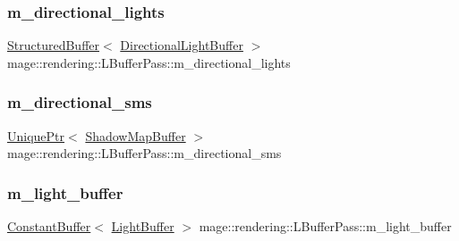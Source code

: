 \subsubsection{\texorpdfstring{m\+\_\+directional\+\_\+lights}{m\_directional\_lights}}
{\footnotesize\ttfamily \mbox{\hyperlink{classmage_1_1rendering_1_1_structured_buffer}{Structured\+Buffer}}$<$ \mbox{\hyperlink{structmage_1_1rendering_1_1_directional_light_buffer}{Directional\+Light\+Buffer}} $>$ mage\+::rendering\+::\+L\+Buffer\+Pass\+::m\+\_\+directional\+\_\+lights\hspace{0.3cm}{\ttfamily [private]}}

\mbox{\label{classmage_1_1rendering_1_1_l_buffer_pass_a76627c9dc2cc229c07584dc2b2599db4}} 
\subsubsection{\texorpdfstring{m\+\_\+directional\+\_\+sms}{m\_directional\_sms}}
{\footnotesize\ttfamily \mbox{\hyperlink{namespacemage_a3316d7143a973e37adf1110f2e80ca31}{Unique\+Ptr}}$<$ \mbox{\hyperlink{classmage_1_1rendering_1_1_shadow_map_buffer}{Shadow\+Map\+Buffer}} $>$ mage\+::rendering\+::\+L\+Buffer\+Pass\+::m\+\_\+directional\+\_\+sms\hspace{0.3cm}{\ttfamily [private]}}

\mbox{\label{classmage_1_1rendering_1_1_l_buffer_pass_ab80d18b8193e90588afa5e992b5b1af8}} 
\subsubsection{\texorpdfstring{m\+\_\+light\+\_\+buffer}{m\_light\_buffer}}
{\footnotesize\ttfamily \mbox{\hyperlink{classmage_1_1rendering_1_1_constant_buffer}{Constant\+Buffer}}$<$ \mbox{\hyperlink{structmage_1_1rendering_1_1_light_buffer}{Light\+Buffer}} $>$ mage\+::rendering\+::\+L\+Buffer\+Pass\+::m\+\_\+light\+\_\+buffer\hspace{0.3cm}{\ttfamily [private]}}

